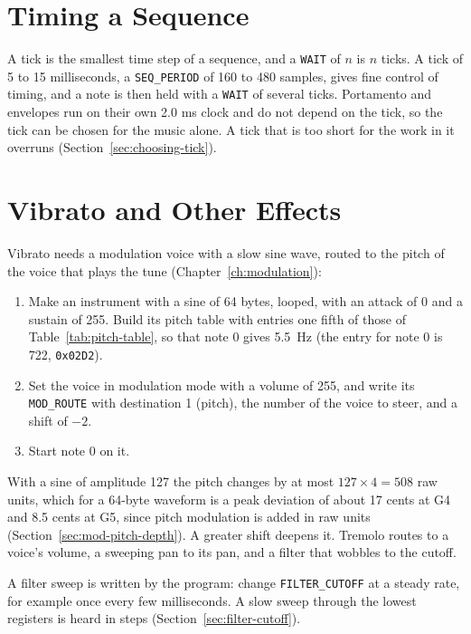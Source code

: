 \section{Timing a Sequence}

A tick is the smallest time step of a sequence, and a \texttt{WAIT} of $n$ is $n$ ticks. A tick of 5 to 15
milliseconds, a \texttt{SEQ\_PERIOD} of 160 to 480 samples, gives fine control of timing, and a note is then held with
a \texttt{WAIT} of several ticks. Portamento and envelopes run on their own 2.0 ms clock and do not depend on the tick,
so the tick can be chosen for the music alone. A tick that is too short for the work in it overruns
(Section~\ref{sec:choosing-tick}).

\section{Vibrato and Other Effects}

Vibrato needs a modulation voice with a slow sine wave, routed to the pitch of the voice that plays the tune
(Chapter~\ref{ch:modulation}):

\begin{enumerate}
	\item Make an instrument with a sine of 64 bytes, looped, with an attack of 0 and a sustain of 255. Build its pitch table
	      with entries one fifth of those of Table~\ref{tab:pitch-table}, so that note 0 gives 5.5~Hz (the entry for note 0 is
	      722, \texttt{0x02D2}).
	\item Set the voice in modulation mode with a volume of 255, and write its \texttt{MOD\_ROUTE} with destination 1 (pitch),
	      the number of the voice to steer, and a shift of $-2$.
	\item Start note 0 on it.
\end{enumerate}

With a sine of amplitude 127 the pitch changes by at most $127 \times 4 = 508$ raw units, which for a 64-byte waveform
is a peak deviation of about 17 cents at G4 and 8.5 cents at G5, since pitch modulation is added in raw units
(Section~\ref{sec:mod-pitch-depth}). A greater shift deepens it. Tremolo routes to a voice's volume, a sweeping pan to
its pan, and a filter that wobbles to the cutoff.

A filter sweep is written by the program: change \texttt{FILTER\_CUTOFF} at a steady rate, for example once every few
milliseconds. A slow sweep through the lowest registers is heard in steps (Section~\ref{sec:filter-cutoff}).

